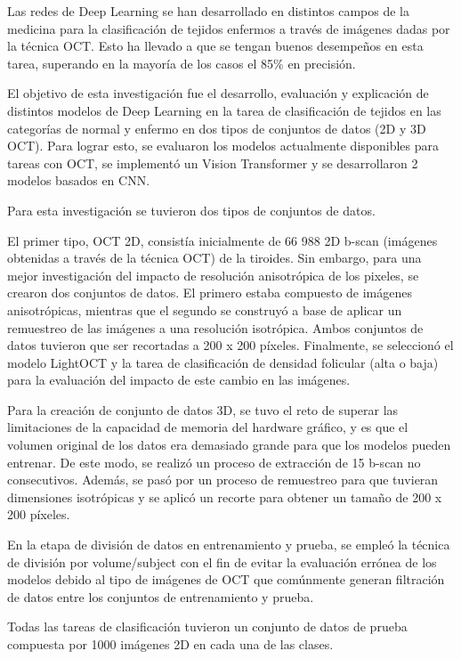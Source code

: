 Las redes de Deep Learning se han desarrollado en distintos campos de la medicina para la clasificación de tejidos enfermos a través de imágenes dadas por la técnica OCT. Esto ha llevado a que se tengan buenos desempeños en esta tarea, superando en la mayoría de los casos el 85\% en precisión.

El objetivo de esta investigación fue el desarrollo, evaluación y explicación de distintos modelos de Deep Learning en la tarea de clasificación de tejidos en las categorías de normal y enfermo en dos tipos de conjuntos de datos (2D y 3D OCT). Para lograr esto, se evaluaron los modelos actualmente disponibles para tareas con OCT, se implementó un Vision Transformer y se desarrollaron 2 modelos basados en CNN.

Para esta investigación se tuvieron dos tipos de conjuntos de datos.

El primer tipo, OCT 2D, consistía inicialmente de 66 988 2D b-scan (imágenes obtenidas a través de la técnica OCT) de la tiroides. Sin embargo, para una mejor investigación del impacto de resolución anisotrópica de los pixeles, se crearon dos conjuntos de datos. El primero estaba compuesto de imágenes anisotrópicas, mientras que el segundo se construyó a base de aplicar un remuestreo de las imágenes a una resolución isotrópica. Ambos conjuntos de datos tuvieron que ser recortadas a 200 x 200 píxeles. Finalmente, se seleccionó el modelo LightOCT y la tarea de clasificación de densidad folicular (alta o baja) para la evaluación del impacto de este cambio en las imágenes.

Para la creación de conjunto de datos 3D, se tuvo el reto de superar las limitaciones de la capacidad de memoria del hardware gráfico, y es que el volumen original de los datos era demasiado grande para que los modelos pueden entrenar. De este modo, se realizó un proceso de extracción de 15 b-scan no consecutivos. Además, se pasó por un proceso de remuestreo para que tuvieran dimensiones isotrópicas y se aplicó un recorte para obtener un tamaño de 200 x 200 píxeles.

En la etapa de división de datos en entrenamiento y prueba, se empleó la técnica de división por volume/subject con el fin de evitar la evaluación errónea de los modelos debido al tipo de imágenes de OCT que comúnmente generan filtración de datos entre los conjuntos de entrenamiento y prueba.

Todas las tareas de clasificación tuvieron un conjunto de datos de prueba compuesta por 1000 imágenes 2D en cada una de las clases.

